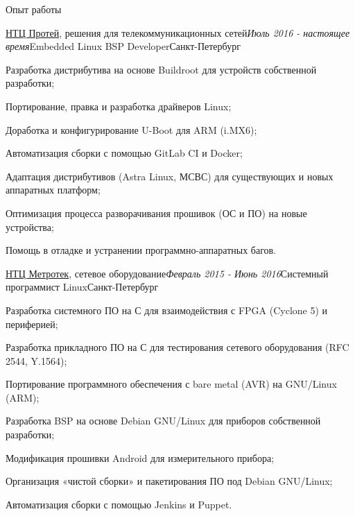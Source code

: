 \documentclass[hidelinks]{resume} %
\begin{document}

\begin{rSection}{Опыт работы}


\begin{rSubsection}{\href{http://protei-st.ru}{НТЦ Протей}, решения для телекоммуникационных сетей}{\em Июль 2016 - настоящее время}{Embedded Linux BSP Developer}{Санкт-Петербург}
\item Разработка дистрибутива на основе Buildroot для устройств собственной разработки;
\item Портирование, правка и разработка драйверов Linux;
\item Доработка и конфигурирование U-Boot для ARM (i.MX6);
\item Автоматизация сборки с помощью GitLab CI и Docker;
\item Адаптация дистрибутивов (Astra Linux, МСВС) для существующих и новых аппаратных платформ;
\item Оптимизация процесса разворачивания прошивок (ОС и ПО) на новые устройства;
\item Помощь в отладке и устранении программно-аппаратных багов.
\end{rSubsection}


\begin{rSubsection}{\href{http://metrotek.spb.ru}{НТЦ Метротек}, сетевое оборудование}{\em Февраль 2015 - Июнь 2016}{Системный программист Linux}{Санкт-Петербург}
\item Разработка системного ПО на С для взаимодействия с FPGA (Cyclone 5) и периферией;
\item Разработка прикладного ПО на С для тестирования сетевого оборудования (RFC 2544, Y.1564);
\item Портирование программного обеспечения с bare metal (AVR) на GNU/Linux (ARM);
\item Разработка BSP на основе Debian GNU/Linux для приборов собственной разработки;
\item Модификация прошивки Android для измерительного прибора;
\item Организация «чистой сборки» и пакетирования ПО под Debian GNU/Linux;
\item Автоматизация сборки с помощью Jenkins и Puppet.
\end{rSubsection}


\end{rSection}
\end{document}
